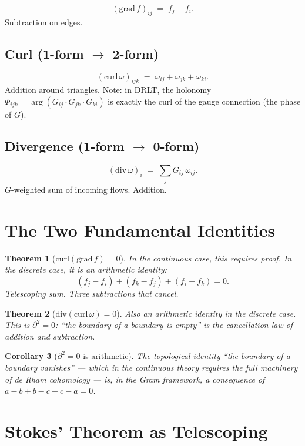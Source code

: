 \documentclass[11pt]{article}
\newtheorem{theorem}{Theorem}
\newtheorem{corollary}[theorem]{Corollary}
\begin{document}
\[
  (\mathrm{grad}\, f)_{ij} \;=\; f_j - f_i.
\]
Subtraction on edges.

\subsection{Curl (1-form $\to$ 2-form)}

\[
  (\mathrm{curl}\, \omega)_{ijk} \;=\;
  \omega_{ij} + \omega_{jk} + \omega_{ki}.
\]
Addition around triangles. Note: in DRLT, the holonomy
$\Phi_{ijk} = \arg(G_{ij} \cdot G_{jk} \cdot G_{ki})$
is exactly the curl of the gauge connection (the phase of $G$).

\subsection{Divergence (1-form $\to$ 0-form)}

\[
  (\mathrm{div}\, \omega)_i \;=\;
  \sum_j G_{ij}\, \omega_{ij}.
\]
$G$-weighted sum of incoming flows. Addition.

\section{The Two Fundamental Identities}

\begin{theorem}[$\mathrm{curl}(\mathrm{grad}\,f) = 0$]
In the continuous case, this requires proof.
In the discrete case, it is an arithmetic identity:
\[
  (f_j - f_i) + (f_k - f_j) + (f_i - f_k) = 0.
\]
Telescoping sum. Three subtractions that cancel.
\end{theorem}

\begin{theorem}[$\mathrm{div}(\mathrm{curl}\,\omega) = 0$]
Also an arithmetic identity in the discrete case.
This is $\partial^2 = 0$: ``the boundary of a boundary is empty''
is the cancellation law of addition and subtraction.
\end{theorem}

\begin{corollary}[$\partial^2 = 0$ is arithmetic]
The topological identity ``the boundary of a boundary vanishes''
--- which in the continuous theory requires the full machinery
of de Rham cohomology --- is, in the Gram framework, a
consequence of $a - b + b - c + c - a = 0$.
\end{corollary}

\section{Stokes' Theorem as Telescoping}
\end{document}
